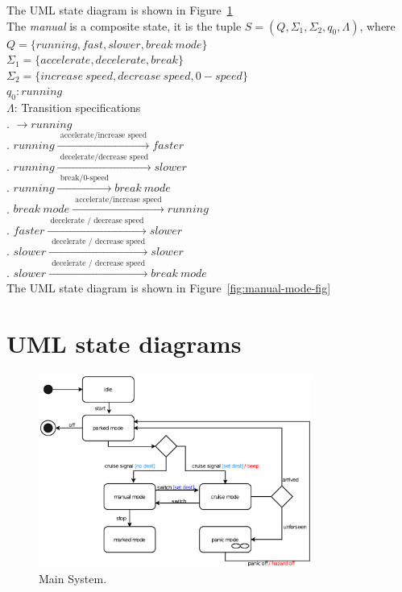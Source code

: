 \documentclass[12pt]{article}
\begin{document}
\begin{spacing}{1.5}
\noindent The UML state diagram is shown in Figure~\ref{fig:main-system-fig}\\

\noindent The \textit{manual} is a composite state, it is the tuple $S = (Q, \Sigma_1, \Sigma_2, q_0, \Lambda)$, where\\

\noindent $Q = \{running, fast, slower, break~mode\}$\\
\noindent $\Sigma_1 = \{accelerate, decelerate, break\}$\\
\noindent $\Sigma_2 = \{increase~speed, decrease~speed, 0-speed\}$\\
\noindent $q_0: running$\\
\noindent $\Lambda$: Transition specifications\\
. $\rightarrow running$\\
. $running \xrightarrow {\text { accelerate/increase speed }} faster$\\
. $running \xrightarrow {\text { decelerate/decrease speed }} slower$\\
. $running \xrightarrow {\text { break/0-speed }} break~mode$\\
. $break~mode \xrightarrow {\text { accelerate/increase speed }} running$\\
. $faster \xrightarrow {\text { decelerate / decrease speed }} slower$\\
. $slower \xrightarrow {\text { decelerate / decrease speed }} slower$\\
. $slower \xrightarrow {\text { decelerate / decrease speed }} break~mode$\\

\noindent The UML state diagram is shown in Figure~\ref{fig:manual-mode-fig}\\

\newpage

\section{UML state diagrams}

\begin{figure}[h!]
	\centering
		\includegraphics[width=0.8\textwidth]{./A2_Figures/4.1-Main-System.eps}
		  \caption{Main System.}
  \label{fig:main-system-fig}
\end{figure}


\end{spacing}
\end{document}
